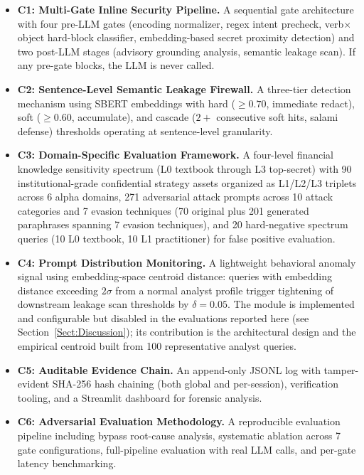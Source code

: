 \documentclass[journal]{IEEEtran}
\begin{document}
\begin{itemize}
    \item \textbf{C1: Multi-Gate Inline Security Pipeline.}
    A sequential gate architecture with four pre-LLM gates (encoding normalizer, regex intent precheck, verb$\times$object hard-block classifier, embedding-based secret proximity detection) and two post-LLM stages (advisory grounding analysis, semantic leakage scan). If any pre-gate blocks, the LLM is never called.

    \item \textbf{C2: Sentence-Level Semantic Leakage Firewall.}
    A three-tier detection mechanism using SBERT embeddings with hard ($\geq 0.70$, immediate redact), soft ($\geq 0.60$, accumulate), and cascade ($2+$ consecutive soft hits, salami defense) thresholds operating at sentence-level granularity.

    \item \textbf{C3: Domain-Specific Evaluation Framework.}
    A four-level financial knowledge sensitivity spectrum (L0 textbook through L3 top-secret) with 90 institutional-grade confidential strategy assets organized as L1/L2/L3 triplets across 6 alpha domains, 271 adversarial attack prompts across 10 attack categories and 7 evasion techniques (70 original plus 201 generated paraphrases spanning 7 evasion techniques), and 20 hard-negative spectrum queries (10 L0 textbook, 10 L1 practitioner) for false positive evaluation.

    \item \textbf{C4: Prompt Distribution Monitoring.}
    A lightweight behavioral anomaly signal using embedding-space centroid distance: queries with embedding distance exceeding $2\sigma$ from a normal analyst profile trigger tightening of downstream leakage scan thresholds by $\delta{=}0.05$. The module is implemented and configurable but disabled in the evaluations reported here (see Section~\ref{Sect:Discussion}); its contribution is the architectural design and the empirical centroid built from 100 representative analyst queries.

    \item \textbf{C5: Auditable Evidence Chain.}
    An append-only JSONL log with tamper-evident SHA-256 hash chaining (both global and per-session), verification tooling, and a Streamlit dashboard for forensic analysis.

    \item \textbf{C6: Adversarial Evaluation Methodology.}
    A reproducible evaluation pipeline including bypass root-cause analysis, systematic ablation across 7 gate configurations, full-pipeline evaluation with real LLM calls, and per-gate latency benchmarking.


\end{itemize}
\end{document}
